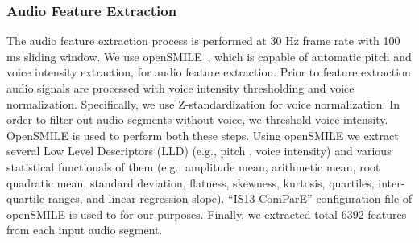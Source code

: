 \documentclass[review]{elsarticle}
\newcommand\?[1]{\hl{#1}}
\begin{document}


\subsubsection{Audio Feature Extraction}
\label{audio}

The audio feature extraction process is performed at 30 Hz frame rate with 100
ms sliding window. We use openSMILE~\citep{eyben2010opensmile}, which is capable
of automatic pitch and voice intensity extraction, for audio feature
extraction. Prior to feature extraction audio signals are processed with voice
intensity thresholding and voice normalization. Specifically, we use
Z-standardization for voice normalization. In order to filter out audio segments
without voice, we threshold voice intensity. OpenSMILE is used to perform both
these steps. Using openSMILE we extract several Low Level Descriptors (LLD)
(e.g., pitch , voice intensity) and various statistical functionals of them
(e.g., amplitude mean, arithmetic mean, root quadratic mean, standard deviation,
flatness, skewness, kurtosis, quartiles, inter-quartile ranges, and linear
regression slope). ``IS13-ComParE'' configuration file of openSMILE is used to
for our purposes. Finally, we extracted total 6392 features from each input
audio segment.

\end{document}
